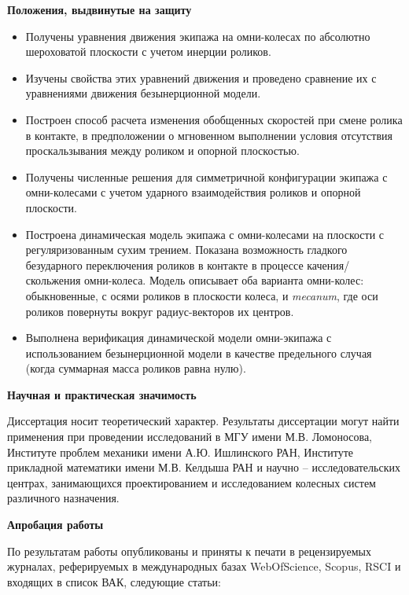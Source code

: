 \textbf{Положения, выдвинутые на защиту}

\begin{itemize}

	\item Получены уравнения движения экипажа на омни-колесах по абсолютно шероховатой плоскости с учетом инерции роликов.

	\item Изучены свойства этих уравнений движения и проведено сравнение их с уравнениями движения безынерционной модели.

	\item Построен способ расчета изменения обобщенных скоростей при смене ролика в контакте, в предположении о мгновенном выполнении условия отсутствия проскальзывания между роликом и опорной плоскостью.

	\item Получены численные решения для симметричной конфигурации экипажа с омни-колесами с учетом ударного взаимодействия роликов и опорной плоскости.

	\item Построена динамическая модель экипажа с омни-колесами на плоскости с регуляризованным сухим трением. Показана возможность гладкого безударного переключения роликов в контакте в процессе качения/скольжения омни-колеса. Модель описывает оба варианта омни-колес: обыкновенные, с осями роликов в плоскости колеса, и \textit{mecanum}, где оси роликов повернуты вокруг радиус-векторов их центров.

	\item Выполнена верификация динамической модели омни-экипажа с использованием безынерционной модели в качестве предельного случая (когда суммарная масса роликов равна нулю).
\end{itemize}

\textbf{Научная и практическая значимость}

Диссертация носит теоретический характер. Результаты диссертации могут найти применения при проведении исследований в МГУ имени М.В. Ломоносова, Институте проблем механики имени А.Ю. Ишлинского РАН, Институте прикладной математики имени М.В. Келдыша РАН и научно -- исследовательских центрах, занимающихся проектированием и исследованием колесных систем различного назначения.

\textbf{Апробация работы}

По результатам работы опубликованы и приняты к печати в рецензируемых журналах, реферируемых в международных базах WebOfScience, Scopus, RSCI и входящих в список ВАК, следующие статьи: 

